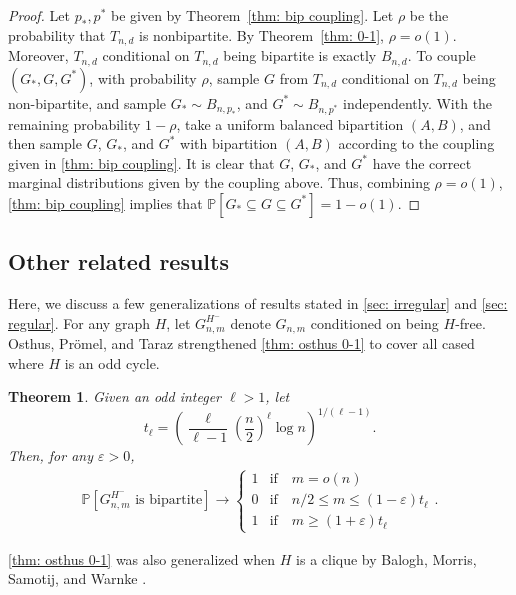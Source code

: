 \documentclass[11pt]{article}
\newcommand{\eps}{\varepsilon}
\def\P{\mathbb P}
\theoremstyle{plain}
\newtheorem{thm}{Theorem}[section]
\begin{document}
\begin{proof}  Let $p_*,p^*$ be given by Theorem~\ref{thm: bip coupling}.
    Let $\rho$ be the probability that $T_{n,d}$ is nonbipartite.  By Theorem~\ref{thm: 0-1}, $\rho=o(1)$. Moreover, $T_{n,d}$ conditional on $T_{n,d}$ being bipartite is exactly $B_{n,d}$. To couple $(G_*,G,G^*)$, with probability $\rho$, sample $G$ from $T_{n,d}$ conditional on $T_{n,d}$ being non-bipartite, and sample $G_*\sim B_{n,p_*}$, and $G^*\sim B_{n,p^*}$ independently. With the remaining probability $1-\rho$, take a uniform balanced bipartition $(A,B)$, and then sample $G$, $G_*$, and $G^*$ with bipartition $(A,B)$ according to the coupling given in \cref{thm: bip coupling}. It is clear that $G$, $G_*$, and $G^*$ have the correct marginal distributions given by the coupling above. Thus, combining $\rho=o(1)$, \cref{thm: bip coupling} implies that $\P[G_* \subseteq G \subseteq G^*] = 1 - o(1)$.
\end{proof}


\subsection{Other related results}\label{sec: other}
Here, we discuss a few generalizations of results stated in \cref{sec: irregular} and \cref{sec: regular}. For any graph $H$, let
$G^{H^-}_{n,m}$ denote $G_{n,m}$ conditioned on being $H$-free. 
Osthus, Pr\"omel, and Taraz \cite{osthus2003densities} strengthened \cref{thm: osthus 0-1} to cover all cased where $H$ is an odd cycle. 

\begin{thm}\cite{osthus2003densities}\label{thm: odd cycles}
    Given an odd integer $\ell> 1$, let 
    \[
    t_\ell = \left(\frac{\ell}{\ell - 1}\left(\frac{n}{2}\right)^\ell\log n\right)^{1/(\ell - 1)}.
    \]
    Then, for any $\eps > 0$, 
    \begin{align*}
    {\P[G _{n,m}^{H^-}\text{ is bipartite}]}\rightarrow \begin{cases}
        1 &\text{if}\quad m = o(n)\\
        0 &\text{if}\quad n/2 \leq m \leq (1 - \eps)t_\ell\\
        1 &\text{if}\quad m \geq (1 + \eps)t_\ell
    \end{cases}
    .
    \end{align*}
\end{thm}

\cref{thm: osthus 0-1} was also generalized when $H$ is a clique by Balogh, Morris, Samotij, and Warnke \cite{BaloghMorrisSamotijWarnke2016TypicalStructure}. 
\end{document}

